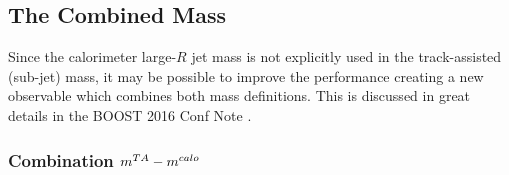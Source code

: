 \subsection{The Combined Mass}
\label{subsec:comb}


Since the calorimeter large-$R$ jet mass is not explicitly used in the track-assisted (sub-jet) mass, it may be possible to improve the performance creating a new observable which combines both mass definitions.
This is discussed in great details in the BOOST 2016 Conf Note \cite{art35}.





\subsubsection{Combination $m^{TA}-m^{calo}$ }

